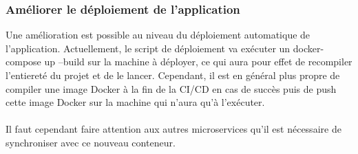 \documentclass{article}
\begin{document}
            \subsubsection{Améliorer le déploiement de l'application}

                Une amélioration est possible au niveau du déploiement automatique de l'application. Actuellement, le script de déploiement va exécuter un docker-compose up --build sur la machine à déployer, ce qui aura pour effet de recompiler l'entiereté du projet et de le lancer. Cependant, il est en général plus propre de compiler une image Docker à la fin de la CI/CD en cas de succès puis de push cette image Docker sur la machine qui n'aura qu'à l'exécuter.\\
                \\
                \indent Il faut cependant faire attention aux autres microservices qu'il est nécessaire de synchroniser avec ce nouveau conteneur.
\end{document}
